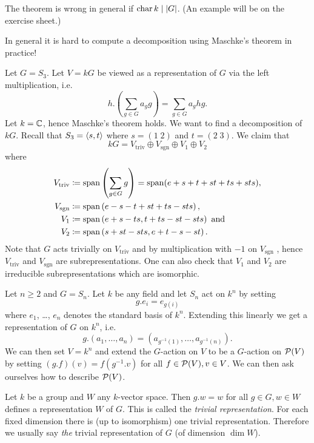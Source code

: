 \begin{warn}
  The theorem is wrong in general if $\operatorname{char} k \mid |G|$. (An example will be on the exercise sheet.)
\end{warn}

\begin{expl}
  In general it is hard to compute a decomposition using Maschke’s theorem in practice!
  
  Let $G = S_3$. Let $V = kG$ be viewed as a representation of $G$ via the left multiplication, i.e.
  \[
    h.\left(\sum_{g \in G} a_g g\right) = \sum_{g \in G} a_g hg.
  \]
  Let $k = \mathbb{C}$, hence Maschke’s theorem holds. We want to find a decomposition of $kG$. Recall that $S_3 = \left\langle s,t \right\rangle$ where $s = (1 \; 2)$ and $t = (2 \; 3)$. We claim that
  \[
    kG = V_{\text{triv}} \oplus V_{\text{sgn}} \oplus V_1 \oplus V_2
  \]
  where
  \begin{align*}
    V_{\text{triv}} &\coloneqq \operatorname{span}\left(\sum_{g \in G} g \right) = \operatorname{span}(e+s+t+st+ts+sts), \\
    V_{\text{sgn}} &\coloneqq \operatorname{span}\left(e-s-t+st+ts-sts\right), \\
    V_1 &\coloneqq \operatorname{span}\left(e+s-ts, t+ts-st-sts\right) \text{ and} \\
    V_2 &\coloneqq \operatorname{span}\left(s+st-sts,e+t-s-st\right).
  \end{align*}
  Note that $G$ acts trivially on $V_{\text{triv}}$ and by multiplication with $-1$ on $V_{\text{sgn}}$ , hence $V_{\text{triv}}$ and $V_{\text{sgn}}$ are subrepresentations. One can also check that $V_1$ and $V_2$ are irreducible subrepresentations which are isomorphic.
\end{expl}


\begin{expl}
  Let $n \geq 2$ and $G = S_n$. Let $k$ be any field and let $S_n$ act on $k^n$ by setting
  \[
    g.e_i = e_{g(i)}
  \]
  where $e_1$, \dots, $e_n$ denotes the standard basis of $k^n$. Extending this linearly we get a representation of $G$ on $k^n$, i.e.
  \[
    g.(a_1, \dotsc, a_n) = \left(a_{g^{-1}(1)}, \dotsc, a_{g^{-1}(n)}\right).
  \]
  We can then set $V = k^n$ and extend the $G$-action on $V$ to be a $G$-action on $\mathcal{P}(V)$ by setting $(g.f)(v) = f(g^{-1}.v)$ for all $f \in \mathcal{P}(V), v \in V$. We can then ask ourselves how to describe $\mathcal{P}(V)$.
\end{expl}


\begin{defi}
  Let $k$ be a group and $W$ any $k$-vector space. Then $g.w = w$ for all $g \in G, w \in W$ defines a representation $W$ of $G$. This is called the \emph{trivial representation}. For each fixed dimension there is (up to isomorphism) one trivial representation. Therefore we usually say \emph{the} trivial representation of $G$ (of dimension $\dim W$).
\end{defi}


